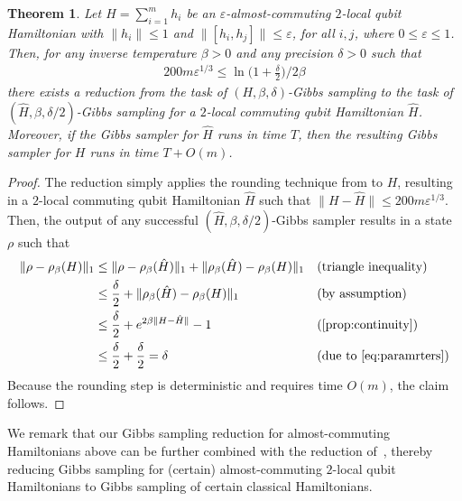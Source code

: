 \documentclass[a4paper,onecolumn,11pt]{quantumarticle}
\theoremstyle{plain}
\newtheorem{theorem}{Theorem}[section]
\newcommand{\eps}{\varepsilon}
\begin{document}
\begin{theorem} 
Let $H = \sum_{i=1}^m h_i$ be an $\eps$-almost-commuting $2$-local qubit Hamiltonian with $\|h_i\|\leq 1$ and $\| [h_i,h_j]\| \leq \eps$, for all $i,j$, where $0\leq\eps\leq 1$. Then, for any inverse temperature $\beta >0$ and any precision $\delta >0$ such that
\begin{align}\label{eq:paramrters}
200 m \eps^{1/3} \leq  \ln\Big(1+\frac{\delta}{2} \Big)/2\beta
\end{align}
there exists a reduction from the task of $(H,\beta,\delta)$-Gibbs sampling to the task of $(\hat{H},\beta,\delta/2)$-Gibbs sampling for a $2$-local commuting qubit Hamiltonian $\hat{H}$. Moreover, if the Gibbs sampler for $\hat{H}$ runs in time $T$, then the resulting Gibbs sampler for $H$ runs in time $T + O(m)$.
\end{theorem}
\begin{proof}
The reduction simply applies the rounding technique from  to $H$, resulting in a $2$-local commuting qubit Hamiltonian $\hat{H}$ such that $\| H - \hat{H} \| \leq 200 m \eps^{1/3}$. Then, the output of any successful $(\hat{H},\beta,\delta/2)$-Gibbs sampler results in a state $\rho$ such that
\begin{align*}
\| \rho - \rho_\beta(H) \|_1 
&\leq \| \rho - \rho_\beta(\hat{H}) \|_1  + \| \rho_\beta(\hat{H}) - \rho_\beta(H) \|_1    && (\text{triangle inequality})\\
&\leq \frac{\delta}{2} + \| \rho_\beta(\hat{H}) - \rho_\beta(H) \|_1 && (\text{by assumption})\\
&\leq  \frac{\delta}{2}  + e^{2 \beta \| H - \hat{H} \|} -1  && (\text{\Cref{prop:continuity}})\\
&\leq \frac{\delta}{2} + \frac{\delta}{2}  = \delta  && (\text{due to~\eqref{eq:paramrters}})
\end{align*}
Because the rounding step is deterministic and requires time $O(m)$, the claim follows.
\end{proof}
We remark that our Gibbs sampling reduction for almost-commuting Hamiltonians above can be further combined with the reduction of~\cite[Theorem 9]{hwang2025gibbsstatepreparationcommuting}, thereby reducing Gibbs sampling for (certain) almost-commuting $2$-local qubit Hamiltonians to Gibbs sampling of certain classical Hamiltonians.
\end{document}
